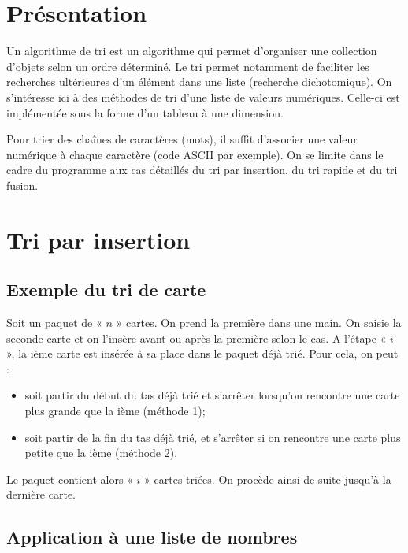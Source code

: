 \documentclass[10pt,fleqn]{article} %
\begin{document}


\section{Présentation}
Un algorithme de tri est un algorithme qui permet d'organiser une collection d'objets selon un ordre déterminé. Le tri permet notamment de faciliter les recherches ultérieures d’un élément dans une liste (recherche dichotomique).
On s’intéresse ici à des méthodes de tri d’une liste de valeurs numériques. Celle-ci est implémentée sous la forme d’un tableau à une dimension.

\begin{rem}
Pour trier des chaînes de caractères (mots), il suffit d’associer une valeur numérique à chaque caractère (code ASCII par exemple). 
On se limite dans le cadre du programme aux cas détaillés du tri par insertion, du tri rapide et du tri fusion.
\end{rem}

\section{Tri par insertion}
\subsection{Exemple du tri de carte}

Soit un paquet de « $n$ » cartes. On prend la première dans une main.
On saisie la seconde carte et on l’insère avant ou après la première selon le cas.
A l’étape « $i$ », la ième carte est insérée à sa place dans le paquet déjà trié. 
Pour cela, on peut :
\begin{itemize}
\item soit partir du début du tas déjà trié et s’arrêter lorsqu'on rencontre une carte plus grande que la ième (méthode 1);
\item soit partir de la fin du tas déjà trié, et s’arrêter si on rencontre une carte plus petite que la ième (méthode 2).
\end{itemize}
Le paquet contient alors « $i$ » cartes triées. On procède ainsi de suite jusqu’à la dernière carte.

\subsection{Application à une liste de nombres}
\end{document}
